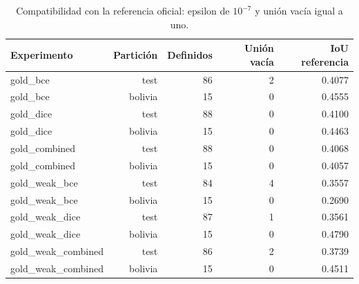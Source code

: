 \begin{table}[H]\centering\small
\caption{Compatibilidad con la referencia oficial: epsilon de $10^{-7}$ y unión vacía igual a uno.}
\begin{tabular}{lrrrr}
\toprule
Experimento & Partición & Definidos & Unión vacía & IoU referencia \\
\midrule
gold\_bce & test & 86 & 2 & 0.4077 \\
gold\_bce & bolivia & 15 & 0 & 0.4555 \\
gold\_dice & test & 88 & 0 & 0.4100 \\
gold\_dice & bolivia & 15 & 0 & 0.4463 \\
gold\_combined & test & 88 & 0 & 0.4068 \\
gold\_combined & bolivia & 15 & 0 & 0.4057 \\
gold\_weak\_bce & test & 84 & 4 & 0.3557 \\
gold\_weak\_bce & bolivia & 15 & 0 & 0.2690 \\
gold\_weak\_dice & test & 87 & 1 & 0.3561 \\
gold\_weak\_dice & bolivia & 15 & 0 & 0.4790 \\
gold\_weak\_combined & test & 86 & 2 & 0.3739 \\
gold\_weak\_combined & bolivia & 15 & 0 & 0.4511 \\
\bottomrule
\end{tabular}
\end{table}
